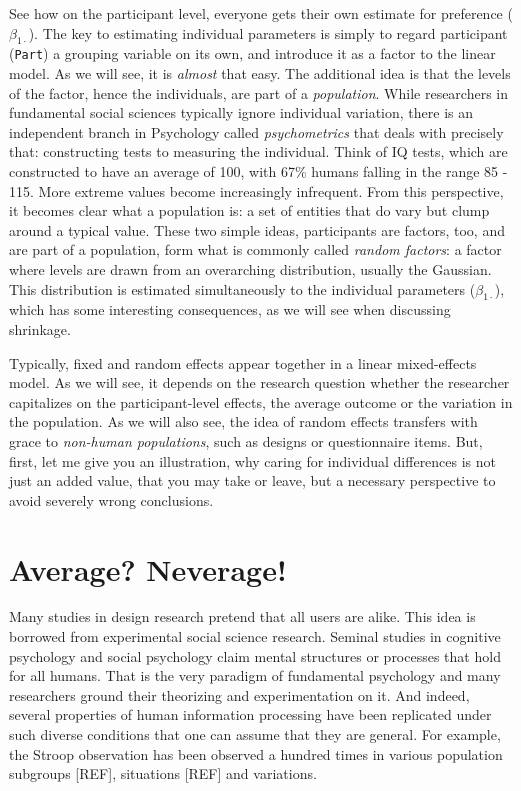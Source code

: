 \documentclass[]{svmono}
\begin{document}
See how on the participant level, everyone gets their own estimate for
preference (\(\beta_{1\cdot}\)). The key to estimating individual
parameters is simply to regard participant (\texttt{Part}) a grouping
variable on its own, and introduce it as a factor to the linear model.
As we will see, it is \emph{almost} that easy. The additional idea is
that the levels of the factor, hence the individuals, are part of a
\emph{population}. While researchers in fundamental social sciences
typically ignore individual variation, there is an independent branch in
Psychology called \emph{psychometrics} that deals with precisely that:
constructing tests to measuring the individual. Think of IQ tests, which
are constructed to have an average of 100, with 67\% humans falling in
the range 85 - 115. More extreme values become increasingly infrequent.
From this perspective, it becomes clear what a population is: a set of
entities that do vary but clump around a typical value. These two simple
ideas, participants are factors, too, and are part of a population, form
what is commonly called \emph{random factors}: a factor where levels are
drawn from an overarching distribution, usually the Gaussian. This
distribution is estimated simultaneously to the individual parameters
(\(\beta_{1\cdot}\)), which has some interesting consequences, as we
will see when discussing shrinkage.

Typically, fixed and random effects appear together in a linear
mixed-effects model. As we will see, it depends on the research question
whether the researcher capitalizes on the participant-level effects, the
average outcome or the variation in the population. As we will also see,
the idea of random effects transfers with grace to \emph{non-human
populations}, such as designs or questionnaire items. But, first, let me
give you an illustration, why caring for individual differences is not
just an added value, that you may take or leave, but a necessary
perspective to avoid severely wrong conclusions.

\section{Average? Neverage!}\label{average-neverage}

Many studies in design research pretend that all users are alike. This
idea is borrowed from experimental social science research. Seminal
studies in cognitive psychology and social psychology claim mental
structures or processes that hold for all humans. That is the very
paradigm of fundamental psychology and many researchers ground their
theorizing and experimentation on it. And indeed, several properties of
human information processing have been replicated under such diverse
conditions that one can assume that they are general. For example, the
Stroop observation has been observed a hundred times in various
population subgroups {[}REF{]}, situations {[}REF{]} and variations.
\end{document}
